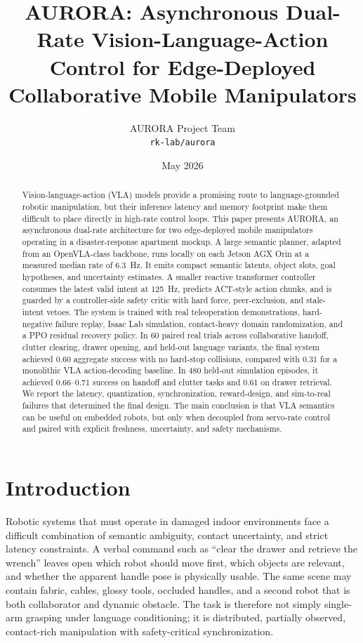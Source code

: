 \documentclass[10pt,twocolumn]{article}
\title{\vspace{-1.0em}AURORA: Asynchronous Dual-Rate Vision-Language-Action Control for Edge-Deployed Collaborative Mobile Manipulators}
\author{
  AURORA Project Team\\
  \texttt{rk-lab/aurora}
}
\date{May 2026}
\begin{document}
\maketitle

\begin{abstract}
Vision-language-action (VLA) models provide a promising route to language-grounded robotic manipulation, but their inference latency and memory footprint make them difficult to place directly in high-rate control loops. This paper presents AURORA, an asynchronous dual-rate architecture for two edge-deployed mobile manipulators operating in a disaster-response apartment mockup. A large semantic planner, adapted from an OpenVLA-class backbone, runs locally on each Jetson AGX Orin at a measured median rate of \SI{6.3}{Hz}. It emits compact semantic latents, object slots, goal hypotheses, and uncertainty estimates. A smaller reactive transformer controller consumes the latest valid intent at \SI{125}{Hz}, predicts ACT-style action chunks, and is guarded by a controller-side safety critic with hard force, peer-exclusion, and stale-intent vetoes. The system is trained with real teleoperation demonstrations, hard-negative failure replay, Isaac Lab simulation, contact-heavy domain randomization, and a PPO residual recovery policy. In 60 paired real trials across collaborative handoff, clutter clearing, drawer opening, and held-out language variants, the final system achieved 0.60 aggregate success with no hard-stop collisions, compared with 0.31 for a monolithic VLA action-decoding baseline. In 480 held-out simulation episodes, it achieved 0.66--0.71 success on handoff and clutter tasks and 0.61 on drawer retrieval. We report the latency, quantization, synchronization, reward-design, and sim-to-real failures that determined the final design. The main conclusion is that VLA semantics can be useful on embedded robots, but only when decoupled from servo-rate control and paired with explicit freshness, uncertainty, and safety mechanisms.
\end{abstract}

\section{Introduction}

Robotic systems that must operate in damaged indoor environments face a difficult combination of semantic ambiguity, contact uncertainty, and strict latency constraints. A verbal command such as ``clear the drawer and retrieve the wrench'' leaves open which robot should move first, which objects are relevant, and whether the apparent handle pose is physically usable. The same scene may contain fabric, cables, glossy tools, occluded handles, and a second robot that is both collaborator and dynamic obstacle. The task is therefore not simply single-arm grasping under language conditioning; it is distributed, partially observed, contact-rich manipulation with safety-critical synchronization.
\end{document}
